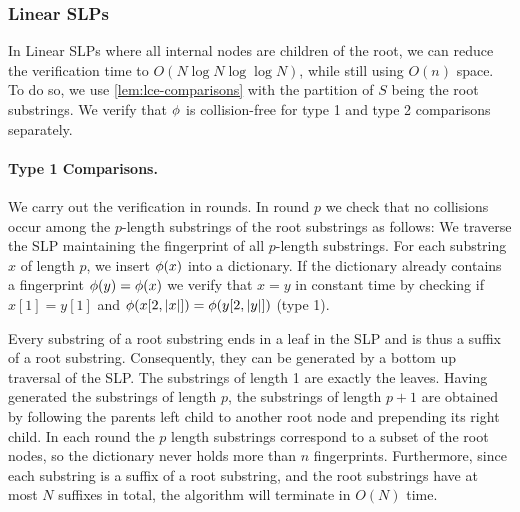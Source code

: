 \documentclass[11pt]{article}
\newcommand{\fp}{\ensuremath\phi}
\begin{document}
\subsubsection{Linear SLPs} In Linear SLPs where all internal nodes are children of the root, we can reduce the verification time to $O(N\log N\log\log N)$, while still using $O(n)$ space. To do so, we use \autoref{lem:lce-comparisons} with the partition of $S$ being the root substrings. We verify that $\fp$ is collision-free for type 1 and type 2 comparisons separately.


\paragraph{Type 1 Comparisons.}
We carry out the verification in rounds. In round $p$ we check that no collisions occur among the $p$-length substrings of the root substrings as follows: We traverse the SLP maintaining the fingerprint of all $p$-length substrings. For each substring $x$ of length $p$, we insert $\fp(x)$ into a dictionary. If the dictionary already contains a fingerprint $\fp(y) = \fp(x)$ we verify that $x=y$ in constant time by checking if $x[1] = y[1]$ and $\fp(x[2,|x|]) = \fp(y[2,|y|])$ (type 1).

Every substring of a root substring ends in a leaf in the SLP and is thus a suffix of a root substring. Consequently, they can be generated by a bottom up traversal of the SLP. The substrings of length 1 are exactly the leaves. Having generated the substrings of length $p$, the substrings of length $p+1$ are obtained by following the parents left child to another root node and prepending its right child. In each round the $p$ length substrings correspond to a subset of the root nodes, so the dictionary never holds more than $n$ fingerprints. Furthermore, since each substring is a suffix of a root substring, and the root substrings have at most $N$ suffixes in total, the algorithm will terminate in $O(N)$ time.
\end{document}
